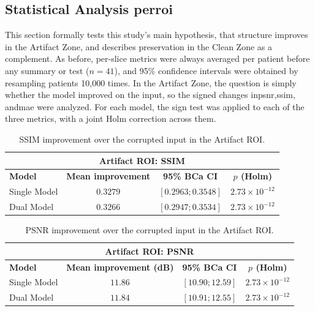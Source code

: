 \subsection{Statistical Analysis per\acrshort{roi}}
\label{sec:statistical-analysis-roi}

This section formally tests this study's main hypothesis, that structure improves in the Artifact Zone, and describes preservation in the Clean Zone as a complement. As before, per-slice metrics were always averaged per patient before any summary or test ($n=41$), and 95\% confidence intervals were obtained by resampling patients 10,000 times. In the Artifact Zone, the question is simply whether the model improved on the input, so the signed changes in\acrshort{psnr},\acrshort{ssim}, and\acrshort{mae} were analyzed. For each model, the sign test was applied to each of the three metrics, with a joint Holm correction across them.

\begin{table}[htbp]
\centering
\small
\begin{tabular}{lccc}
\multicolumn{4}{c}{\textbf{Artifact ROI: SSIM}} \\[3pt]
\toprule
\textbf{Model} & \textbf{Mean improvement} & \textbf{95\% BCa CI} & \textbf{$p$ (Holm)} \\
\midrule
Single Model & $0.3279$ & $[0.2963; 0.3548]$ & $2.73\times10^{-12}$ \\
Dual Model & $0.3266$ & $[0.2947; 0.3534]$ & $2.73\times10^{-12}$ \\
\bottomrule
\end{tabular}
\captionsetup{skip=2pt}
\caption[Artifact-ROI SSIM improvement]{SSIM improvement over the corrupted input in the Artifact ROI.}
\label{tab:roi-artifact-improvement-ssim}
\end{table}

\begin{table}[htbp]
\centering
\small
\begin{tabular}{lccc}
\multicolumn{4}{c}{\textbf{Artifact ROI: PSNR}} \\[3pt]
\toprule
\textbf{Model} & \textbf{Mean improvement (dB)} & \textbf{95\% BCa CI} & \textbf{$p$ (Holm)} \\
\midrule
Single Model & $11.86$ & $[10.90; 12.59]$ & $2.73\times10^{-12}$ \\
Dual Model & $11.84$ & $[10.91; 12.55]$ & $2.73\times10^{-12}$ \\
\bottomrule
\end{tabular}
\captionsetup{skip=2pt}
\caption[Artifact-ROI PSNR improvement]{PSNR improvement over the corrupted input in the Artifact ROI.}
\label{tab:roi-artifact-improvement-psnr}
\end{table}

